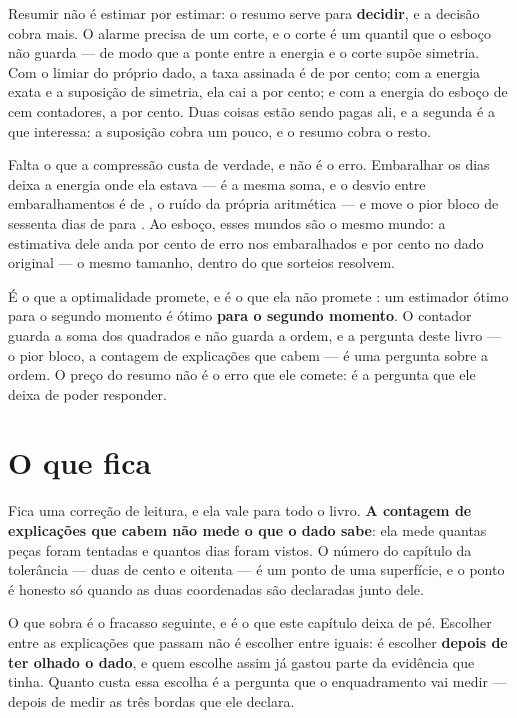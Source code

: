 Resumir não é estimar por estimar: o resumo serve para \textbf{decidir}, e a decisão cobra mais. O
alarme precisa de um corte, e o corte é um quantil que o esboço não guarda --- de modo que a ponte
entre a energia e o corte supõe simetria. Com o limiar do próprio dado, a taxa assinada é de
\numBitsTaxaLimiar{} por cento; com a energia exata e a suposição de simetria, ela cai a \numBitsTaxaGaussiana{} por cento;
e com a energia do esboço de cem contadores, a \numBitsTaxaEsboco{} por cento. Duas coisas estão sendo pagas
ali, e a segunda é a que interessa: a suposição cobra um pouco, e o resumo cobra o resto.

Falta o que a compressão custa de verdade, e não é o erro. Embaralhar os dias deixa a energia onde
ela estava --- é a mesma soma, e o desvio entre \numBitsPermutacoes{} embaralhamentos é de
\numBitsDesvioEnergia{}, o ruído da própria aritmética --- e move o pior bloco de sessenta dias de
\numBitsPiorMenor{} para \numBitsPiorMaior{}. Ao esboço, esses mundos são o mesmo mundo: a estimativa
dele anda \numBitsErroEmbaralhado{} por cento de erro nos embaralhados e \numBitsErroCem{} por cento
no dado original ---
o mesmo tamanho, dentro do que \numBitsMundos{} sorteios resolvem.

É o que a optimalidade promete, e é o que ela não promete \cite{zamir2025optimality}: um estimador
ótimo para o segundo momento é ótimo \textbf{para o segundo momento}. O contador guarda a soma dos
quadrados e não guarda a ordem, e a pergunta deste livro --- o pior bloco, a contagem de explicações
que cabem --- é uma pergunta sobre a ordem. O preço do resumo não é o erro que ele comete: é a
pergunta que ele deixa de poder responder.

\section{O que fica}

Fica uma correção de leitura, e ela vale para todo o livro. \textbf{A contagem de explicações que
cabem não mede o que o dado sabe}: ela mede quantas peças foram tentadas e quantos dias foram
vistos. O número do capítulo da tolerância --- duas de cento e oitenta --- é um ponto de uma
superfície, e o ponto é honesto só quando as duas coordenadas são declaradas junto dele.

O que sobra é o fracasso seguinte, e é o que este capítulo deixa de pé. Escolher entre as
explicações que passam não é escolher entre iguais: é escolher \textbf{depois de ter olhado o dado}, e
quem escolhe assim já gastou parte da evidência que tinha. Quanto custa essa escolha é a pergunta
que o enquadramento vai medir --- depois de medir as três bordas que ele declara.
